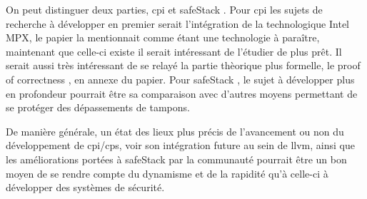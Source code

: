 On peut distinguer deux parties, \gls{cpi} et \og \gls{safeStack} \fg.
Pour \gls{cpi} les sujets de recherche à développer en premier serait l'intégration
de la technologique Intel MPX, le papier la mentionnait comme étant une technologie
à paraître, maintenant que celle-ci existe il serait intéressant de l'étudier de
plus prêt. Il serait aussi très intéressant de se relayé la partie thèorique
plus formelle, le \og proof of correctness \fg, en annexe du papier.
Pour \og \gls{safeStack} \fg, le sujet à développer plus en profondeur pourrait
être sa comparaison avec d'autres moyens permettant de se protéger des dépassements
de tampons.

De manière générale, un état des lieux plus précis de l'avancement ou non du
développement de \gls{cpi}/\gls{cps}, voir son intégration future au sein de \gls{llvm},
ainsi que les améliorations portées à \og \gls{safeStack} \fg par la communauté pourrait
être un bon moyen de se rendre compte du dynamisme et de la rapidité qu'à celle-ci à
développer des systèmes de sécurité.
